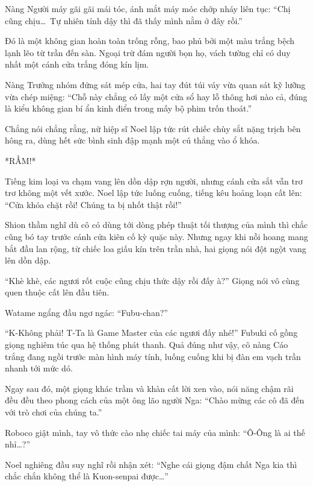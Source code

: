 \documentclass[../main.tex]{subfiles}
\begin{document}
Nàng Người máy gãi gãi mái tóc, ánh mắt máy móc chớp nháy liên tục: ``Chị cũng chịu\dots\ Tự nhiên tỉnh dậy thì đã thấy mình nằm ở đây rồi.''

Đó là một không gian hoàn toàn trống rỗng, bao phủ bởi một màu trắng bệch lạnh lẽo từ trần đến sàn. Ngoại trừ đám người bọn họ, vách tường chỉ có duy nhất một cánh cửa trắng đóng kín lịm.


Nàng Trưởng nhóm đứng sát mép cửa, hai tay đút túi váy vừa quan sát kỹ lưỡng vừa chép miệng: ``Chỗ này chẳng có lấy một cửa sổ hay lỗ thông hơi nào cả, đúng là kiểu không gian bí ẩn kinh điển trong mấy bộ phim trốn thoát.''

Chẳng nói chẳng rằng, nữ hiệp sĩ Noel lập tức rút chiếc chùy sắt nặng trịch bên hông ra, dùng hết sức bình sinh đập mạnh một cú thẳng vào ổ khóa.

*RẦM!*

Tiếng kim loại va chạm vang lên dồn dập rợn người, nhưng cánh cửa sắt vẫn trơ trơ không một vết xước. Noel lập tức luống cuống, tiếng kêu hoảng loạn cất lên: ``Cửa khóa chặt rồi! Chúng ta bị nhốt thật rồi!''

Shion thầm nghĩ dù cô có dùng tới dòng phép thuật tối thượng của mình thì chắc cũng bó tay trước cánh cửa kiên cố kỳ quặc này. Nhưng ngay khi nỗi hoang mang bắt đầu lan rộng, từ chiếc loa giấu kín trên trần nhà, hai giọng nói đột ngột vang lên dồn dập.

``Khè khè, các ngươi rốt cuộc cũng chịu thức dậy rồi đấy à?'' Giọng nói vô cùng quen thuộc cất lên đầu tiên.

Watame ngẩng đầu ngơ ngác: ``Fubu-chan?''

``K-Không phải! T-Ta là Game Master của các ngươi đấy nhé!'' Fubuki cố gồng giọng nghiêm túc qua hệ thống phát thanh. Quả đúng như vậy, cô nàng Cáo trắng đang ngồi trước màn hình máy tính, luống cuống khi bị đàn em vạch trần nhanh tới mức dó.


Ngay sau đó, một giọng khác trầm và khàn cất lời xen vào, nói năng chậm rãi đều đều theo phong cách của một ông lão người Nga: ``Chào mừng các cô đã đến với trò chơi của chúng ta.''

Roboco giật mình, tay vô thức cào nhẹ chiếc tai máy của mình: ``Ô-Ông là ai thế nhỉ\dots?''

Noel nghiêng đầu suy nghĩ rồi nhận xét: ``Nghe cái giọng đậm chất Nga kia thì chắc chắn không thể là Kuon-senpai được\dots''
\end{document}
